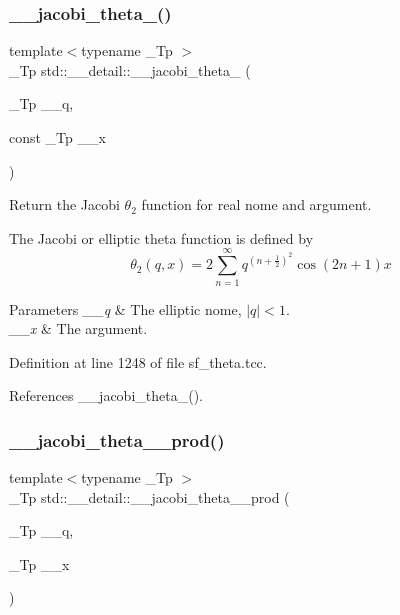 \subsubsection{\texorpdfstring{\+\_\+\+\_\+jacobi\+\_\+theta\+\_()}{\_\_jacobi\_theta\_2()}\hspace{0.1cm}{\footnotesize\ttfamily [2/2]}}
{\footnotesize\ttfamily template$<$typename \+\_\+\+Tp $>$ \\
\+\_\+\+Tp std\+::\+\_\+\+\_\+detail\+::\+\_\+\+\_\+jacobi\+\_\+theta\+\_ (\begin{DoxyParamCaption}\item[{\+\_\+\+Tp}]{\+\_\+\+\_\+q,  }\item[{const \+\_\+\+Tp}]{\+\_\+\+\_\+x }\end{DoxyParamCaption})}

Return the Jacobi $ \theta_2 $ function for real nome and argument.

The Jacobi or elliptic theta function is defined by \[ \theta_2(q,x) = 2\sum_{n=1}^{\infty} q^{(n+\frac{1}{2})^2}\cos{(2n+1)x} \]


\begin{DoxyParams}{Parameters}
{\em \+\_\+\+\_\+q} & The elliptic nome, $ |q| < 1 $. \\
\hline
{\em \+\_\+\+\_\+x} & The argument. \\
\hline
\end{DoxyParams}


Definition at line 1248 of file sf\+\_\+theta.\+tcc.



References \+\_\+\+\_\+jacobi\+\_\+theta\+\_().

\mbox{\label{namespacestd_1_1____detail_acc790f257c25f021704f9c9e1ad9df29}} 
\subsubsection{\texorpdfstring{\+\_\+\+\_\+jacobi\+\_\+theta\+\_\+\_\+prod()}{\_\_jacobi\_theta\_2\_prod()}}
{\footnotesize\ttfamily template$<$typename \+\_\+\+Tp $>$ \\
\+\_\+\+Tp std\+::\+\_\+\+\_\+detail\+::\+\_\+\+\_\+jacobi\+\_\+theta\+\_\+\_\+prod (\begin{DoxyParamCaption}\item[{\+\_\+\+Tp}]{\+\_\+\+\_\+q,  }\item[{\+\_\+\+Tp}]{\+\_\+\+\_\+x }\end{DoxyParamCaption})}

